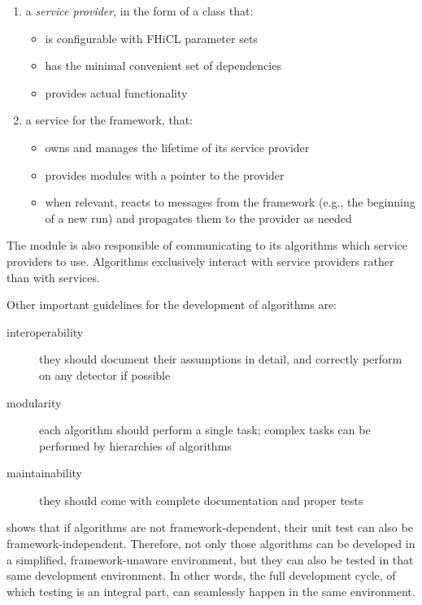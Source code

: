 \begin{enumerate}
   \item
      a \emph{service provider}, in the form of a class that:
      \begin{itemize}
         \item
            is configurable with FHiCL parameter sets
         \item
            has the minimal convenient set of dependencies
         \item
            provides actual functionality
      \end{itemize}
   \item
      a service for the \ART framework, that:
      \begin{itemize}
         \item
            owns and manages the lifetime of its service provider
         \item
            provides modules with a pointer to the provider
         \item
            when relevant, reacts to messages from the framework (e.g., the
            beginning of a new run) and propagates them to the provider as needed
      \end{itemize}
\end{enumerate}
The module is also responsible of communicating to its algorithms which
service providers to use. Algorithms exclusively interact with service
providers rather than with \ART services.

Other important guidelines for the development of algorithms are:

\begin{description}
   \item[interoperability]
      they should document their assumptions in detail,
      and correctly perform on any detector if possible
   \item[modularity]
      each algorithm should perform a single task;
      complex tasks can be performed by hierarchies of algorithms
   \item[maintainability]
      they should come with complete documentation and proper tests
\end{description}

 shows that if algorithms are not
framework-dependent, their unit test can also be framework-independent.
Therefore, not only those algorithms can be developed in a simplified,
framework-unaware environment, but they can also be tested in that same
development environment. In other words, the full development cycle, of
which testing is an integral part, can seamlessly happen in the same
environment.


